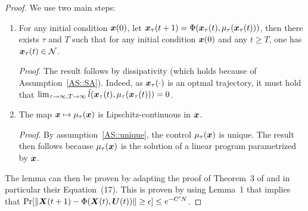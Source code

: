 \begin{proof}
    We use two main steps:
    \begin{enumerate}
        \item For any initial condition ${\bm{x}}(0)$, let ${\bm{x}}_\tau(t+1)=\Phi({\bm{x}}_\tau(t), \mu_\tau({\bm{x}}_\tau(t)))$, then there exists $\tau$ and $T$ such that for any initial condition ${\bm{x}}(0)$ and any $t\ge T$, one has ${\bm{x}}_\tau(t)\in\mathcal{N}$.
        
        \emph{Proof}. The result follows by dissipativity (which holds because of Assumption~\ref{AS::SA}). Indeed, as ${\bm{x}}_{\tau}(\cdot)$ is an optmal trajectory, it must hold that $\lim_{\tau\to\infty, T\to\infty} \Tilde{l}({\bm{x}}_\tau(t), \mu_\tau({\bm{x}}_\tau(t))) = 0$.
        
        \item The map ${\bm{x}}\mapsto\mu_\tau({\bm{x}})$ is Lipschitz-continuous in ${\bm{x}}$. 
        
        \emph{Proof}. By assumption~\ref{AS::unique}, the control $\mu_\tau({\bm{x}})$ is unique. The result then follows because $\mu_\tau({\bm{x}})$ is the solution of a linear program parametrized by ${\bm{x}}$.
    \end{enumerate}
    The lemma can then be proven by adapting the proof of Theorem~3 of \cite{GGY23b} and in particular their Equation~(17). This is proven by using Lemma~1 \cite{GGY23b} that implies that $\Pr[\|{\bm{X}(t+1)}-\Phi({\bm{X}(t)}, \bm{U}(t))\| \ge \epsilon] \le e^{-C'N}$. 
\end{proof}

